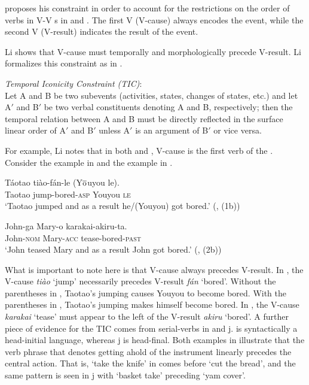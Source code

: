 \documentclass[output=paper]{LSP/langsci}
\begin{document}
\citet[499]{Li1993} proposes his constraint in order to account for the restrictions on the order of verbs in V-V  s in  and . The first V (V-cause) always encodes the event, while the second V (V-result) indicates the result of the event. 

Li shows that V-cause must temporally and morphologically precede V-result. Li formalizes this constraint as in .

\begin{exe}

\ex\label{ex:rosen:32}
 \emph{Temporal Iconicity Constraint (TIC)}:\\
 Let A and B be two subevents (activities, states, changes of states, etc.) and let A$'$ and B$'$ be two verbal constituents denoting A and B, respectively; then the temporal relation between A and B must be directly reflected in the surface linear order of A$'$ and B$'$ unless A$'$ is an argument of B$'$ or vice versa.
 
 \end{exe}

For example, Li notes that in both  and , V-cause is the first verb of the . Consider the  example in  and the  example in .

 \begin{exe}
 \ex \label{ex:rosen:33}
 \gll Táotao tiào-fán-le (Y$\overline{\rm{o}}$uyou le).\\
 Taotao jump-bored-\textsc{asp} Youyou \textsc{le}\\
 \glt `Taotao jumped and as a result he/(Youyou) got bored.' (\citealt[480]{Li1993}, (1b))
 
 \ex \label{ex:rosen:34}
\gll John-ga Mary-o karakai-akiru-ta.\\
 John-\textsc{nom} Mary-\textsc{acc} tease-bored-\textsc{past}\\
 \glt `John teased Mary and as a result John got bored.'  (\citealt[481]{Li1993}, (2b))
 
 \end{exe}

What is important to note here is that V-cause always precedes V-result. In , the V-cause \textit{ti\`ao} `jump' necessarily precedes V-result \textit{f\'an} `bored'. Without the parentheses in , Taotao's jumping causes Youyou to become bored. With the parentheses in , Taotao's jumping makes himself become bored. In , the V-cause \textit{karakai} `tease' must appear to the left of the V-result \textit{akiru} `bored'. A further piece of evidence for the TIC comes from serial-verbs in  and j.  is syntactically a head-initial language, whereas j is head-final. Both examples in  illustrate that the verb phrase that denotes getting ahold of the instrument linearly precedes the central action. That is, `take the knife' in  comes before `cut the bread', and the same pattern is seen in j with `basket take' preceding `yam cover'.
\end{document}
